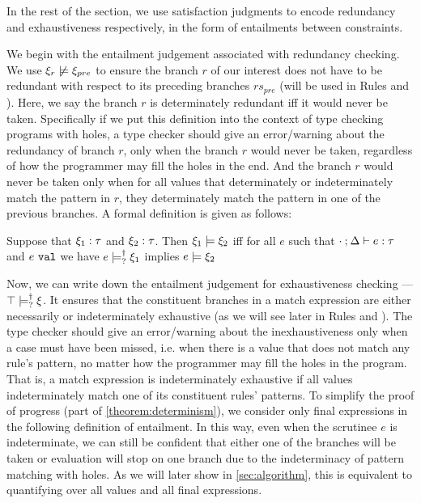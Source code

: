 In the rest of the section, we use satisfaction judgments to encode redundancy and exhaustiveness respectively, in the form of entailments between constraints.%

We begin with the entailment judgement associated with redundancy checking. We use $\cnotsatisfy{\xi_r}{\xi_{pre}}$ to ensure the branch $r$ of our interest does not have to be redundant with respect to its preceding branches $rs_{pre}$ (will be used in Rules \TOneRules and \TRules).
Here, we say the branch $r$ is determinately redundant iff it would never be taken. 
Specifically if we put this definition into the context of type checking programs with holes,
a type checker should give an error/warning about the redundancy of branch $r$,
only when the branch $r$ would never be taken, regardless of how the programmer may fill the holes in the end.
And the branch $r$ would never be taken only when for all values that determinately or indeterminately match the pattern in $r$, they determinately match the pattern in one of the previous branches.
A formal definition is given as follows:

\begin{definition}
  \label{definition:const-entailment}
  Suppose that $\xi_1 : \tau$ and $\xi_2 : \tau$.
  Then $\xi_1 \models \xi_2$ iff for all $e$ such that $\cdot \mathbin{;} \Delta \vdash e : \tau$ and $e ~\mathtt{val}$ we have $e \models_{?}^{\dag} \xi_1$ implies $e \models \xi_2$
\end{definition}

Now, we can write down the entailment judgement for exhaustiveness checking --- $\top \models_{?}^{\dag} \xi$. It ensures that the constituent branches in a match expression are either necessarily or indeterminately exhaustive (as we will see later in Rules \TMatchZPre and \TMatchNZPre). 
The type checker should give an error/warning about the inexhaustiveness only when a case must have been missed, i.e. when there is a value that does not match any rule's pattern, no matter how the programmer may fill the holes in the program. That is, a match expression is indeterminately exhaustive if all values indeterminately match one of its constituent rules' patterns.
To simplify the proof of progress (part of \autoref{theorem:determinism}), we consider only final expressions in the following definition of entailment. 
In this way, even when the scrutinee $e$ is indeterminate, we can still be confident that either one of the branches will be taken or evaluation will stop on one branch due to the indeterminacy of pattern matching with holes. As we will later show in \autoref{sec:algorithm}, this is equivalent to quantifying over all values and all final expressions.

